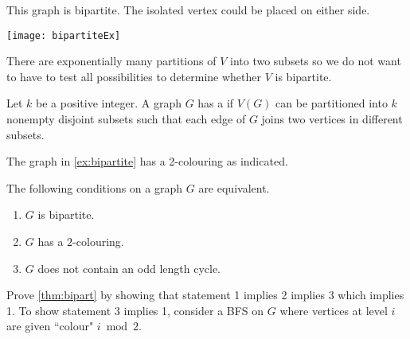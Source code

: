 \begin{Boxample} \label{ex:bipartite}
This graph is bipartite.  
The isolated vertex could be placed on either side.
\begin{center}
\texttt{[image: bipartiteEx]} 
\end{center}
\end{Boxample}

There are exponentially many partitions of $V$ into two subsets so we
do not want to have to test all possibilities to determine whether $V$ is bipartite.

\begin{Definition}
Let $k$ be a positive integer. A graph $G$ has a 
if $V(G)$ can be partitioned into $k$ nonempty disjoint subsets such
that each edge of $G$ joins two vertices in different subsets.
\end{Definition}

\begin{Example}
The graph in \cref{ex:bipartite} has a 2-colouring as indicated.
\end{Example}


\begin{Theorem} 
\label{thm:bipart}
The following conditions on a graph $G$ are equivalent.
\begin{enumerate}
  \item $G$ is bipartite.
  \item $G$ has a $2$-colouring.
  \item $G$ does not contain an odd length cycle.
\end{enumerate}
\end{Theorem}
\begin{Boxample}[6.5]
Prove \cref{thm:bipart}  by showing that statement 1 implies 2 implies 3 which implies 1. To show statement 3 implies 1, consider a BFS on $G$ where vertices at level $i$ are given ``colour" $i \bmod 2$.
\end{Boxample}

